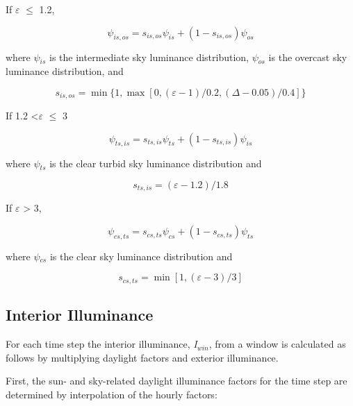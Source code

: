 If \emph{$\varepsilon$} $\leq$ 1.2,

\begin{equation}
{\psi_{is,os}} = {s_{is,os}}{\psi_{is}} + (1 - {s_{is,os}}){\psi_{os}}
\end{equation}

where \emph{$\psi$\(_{is}\)} is the intermediate sky luminance distribution, \emph{$\psi$\(_{os}\)} is the overcast sky luminance distribution, and

\begin{equation}
{s_{is,os}} = \min \{ 1,\max [0,(\varepsilon  - 1)/0.2,(\Delta  - 0.05)/0.4]\}
\end{equation}

If 1.2 \textless{}\emph{$\varepsilon$} $\leq$ 3

\begin{equation}
{\psi_{ts,is}} = {s_{ts,is}}{\psi_{ts}} + (1 - {s_{ts,is}}){\psi_{is}}
\end{equation}

where \emph{$\psi$\(_{ts}\)} is the clear turbid sky luminance distribution and

\begin{equation}
{s_{ts,is}} = (\varepsilon  - 1.2)/1.8
\end{equation}

If \emph{$\varepsilon$} \textgreater{} 3,

\begin{equation}
{\psi_{cs,ts}} = {s_{cs,ts}}{\psi_{cs}} + (1 - {s_{cs,ts}}){\psi_{ts}}
\end{equation}

where \emph{$\psi$\(_{cs}\)} is the clear sky luminance distribution and

\begin{equation}
{s_{cs,ts}} = \min [1,(\varepsilon  - 3)/3]
\end{equation}

\subsection{Interior Illuminance}\label{interior-illuminance}

For each time step the interior illuminance, \emph{I\(_{win}\)}, from a window is calculated as follows by multiplying daylight factors and exterior illuminance.

First, the sun- and sky-related daylight illuminance factors for the time step are determined by interpolation of the hourly factors:

